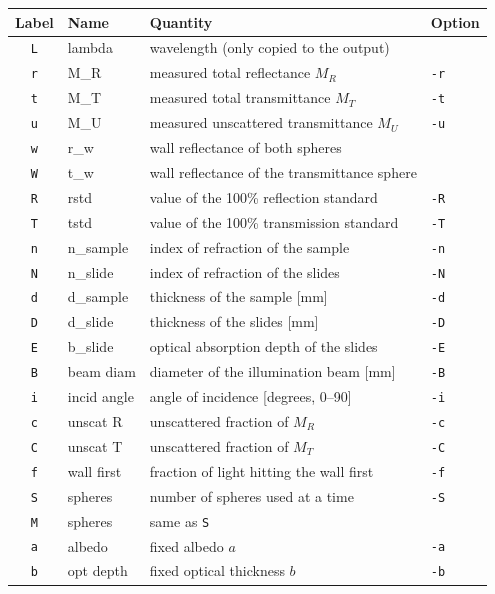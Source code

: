 \documentclass{article}
\begin{document}
\begin{table}
\centering
\small
\begin{tabular}{clll}
\textbf{Label} & \textbf{Name} & \textbf{Quantity} & \textbf{Option}\\\hline
\texttt{L} & lambda & wavelength (only copied to the output) & \\
\texttt{r} & M\_R & measured total reflectance $M_R$ & \texttt{-r}\\
\texttt{t} & M\_T & measured total transmittance $M_T$ & \texttt{-t}\\
\texttt{u} & M\_U & measured unscattered transmittance $M_U$ & \texttt{-u}\\
\texttt{w} & r\_w & wall reflectance of both spheres & \\
\texttt{W} & t\_w & wall reflectance of the transmittance sphere & \\
\texttt{R} & rstd & value of the 100\% reflection standard & \texttt{-R}\\
\texttt{T} & tstd & value of the 100\% transmission standard & \texttt{-T}\\[2mm]
\texttt{n} & n\_sample & index of refraction of the sample & \texttt{-n}\\
\texttt{N} & n\_slide & index of refraction of the slides & \texttt{-N}\\
\texttt{d} & d\_sample & thickness of the sample [mm] & \texttt{-d}\\
\texttt{D} & d\_slide & thickness of the slides [mm] & \texttt{-D}\\
\texttt{E} & b\_slide & optical absorption depth of the slides & \texttt{-E}\\
\texttt{B} & beam diam & diameter of the illumination beam [mm] & \texttt{-B}\\
\texttt{i} & incid angle & angle of incidence [degrees, 0--90] & \texttt{-i}\\
\texttt{c} & unscat R & unscattered fraction of $M_R$ & \texttt{-c}\\
\texttt{C} & unscat T & unscattered fraction of $M_T$ & \texttt{-C}\\
\texttt{f} & wall first & fraction of light hitting the wall first & \texttt{-f}\\
\texttt{S} & spheres & number of spheres used at a time & \texttt{-S}\\
\texttt{M} & spheres & same as \texttt{S} & \\[2mm]
\texttt{a} & albedo & fixed albedo $a$ & \texttt{-a}\\
\texttt{b} & opt depth & fixed optical thickness $b$ & \texttt{-b}\\

\end{tabular}
\end{table}
\end{document}
